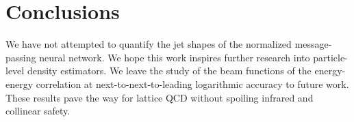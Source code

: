 \section{Conclusions}\label{sec:conclusions}

We have not attempted to quantify the jet shapes of the normalized
message-passing neural network. We hope this work inspires further
research into particle-level density estimators. We leave the study of
the beam functions of the energy-energy correlation at
next-to-next-to-leading logarithmic accuracy to future work. These
results pave the way for lattice QCD without spoiling infrared and
collinear safety.


